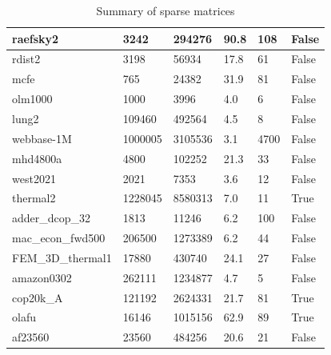 \documentclass[12pt,oneside]{book} %
\begin{document}
\begin{table}[h]
\begin{tabular}{|l|l|l|l|l|l|}
        raefsky2             & 3242       & 294276      & 90.8             & 108              & False              \\ \hline
        rdist2               & 3198       & 56934       & 17.8             & 61               & False              \\ \hline
        mcfe                 & 765        & 24382       & 31.9             & 81               & False              \\ \hline
        olm1000              & 1000       & 3996        & 4.0              & 6                & False              \\ \hline
        lung2                & 109460     & 492564      & 4.5              & 8                & False              \\ \hline
        webbase-1M           & 1000005    & 3105536     & 3.1              & 4700             & False              \\ \hline
        mhd4800a             & 4800       & 102252      & 21.3             & 33               & False              \\ \hline
        west2021             & 2021       & 7353        & 3.6              & 12               & False              \\ \hline
        thermal2             & 1228045    & 8580313     & 7.0              & 11               & True               \\ \hline
        adder\_dcop\_32      & 1813       & 11246       & 6.2              & 100              & False              \\ \hline
        mac\_econ\_fwd500    & 206500     & 1273389     & 6.2              & 44               & False              \\ \hline
        FEM\_3D\_thermal1    & 17880      & 430740      & 24.1             & 27               & False              \\ \hline
        amazon0302           & 262111     & 1234877     & 4.7              & 5                & False              \\ \hline
        cop20k\_A            & 121192     & 2624331     & 21.7             & 81               & True               \\ \hline
        olafu                & 16146      & 1015156     & 62.9             & 89               & True               \\ \hline
        af23560              & 23560      & 484256      & 20.6             & 21               & False              \\ \hline
    \end{tabular}
    \caption{Summary of sparse matrices}
    \label{tab:matrix_summary}
\end{table}
\end{document}
